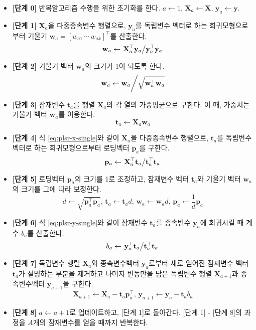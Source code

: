 \documentclass[]{book}
\providecommand{\tightlist}{%
  \setlength{\itemsep}{0pt}\setlength{\parskip}{0pt}}
\begin{document}
\begin{itemize}
\tightlist
\item
  \textbf{{[}단계 0{]}} 반복알고리즘 수행을 위한 초기화를 한다. \(a \leftarrow 1\), \(\mathbf{X}_a \leftarrow \mathbf{X}\), \(\mathbf{y}_a \leftarrow \mathbf{y}\).
\item
  \textbf{{[}단계 1{]}} \(\mathbf{X}_a\)을 다중종속변수 행렬으로, \(\mathbf{y}_a\)를 독립변수 벡터로 하는 회귀모형으로부터 기울기 \(\mathbf{w}_a = [w_{a1} \, \cdots \, w_{ak}]^\top\)를 산출한다.
  \[\mathbf{w}_a \leftarrow \left. \mathbf{X}_a^\top \mathbf{y}_a \middle/ \mathbf{y}_a^\top \mathbf{y}_a \right.  \]
\item
  \textbf{{[}단계 2{]}} 기울기 벡터 \(\mathbf{w}_a\)의 크기가 1이 되도록 한다.
  \[\left. \mathbf{w}_a \leftarrow \mathbf{w}_a \middle/ \sqrt{\mathbf{w}_a^\top \mathbf{w}_a} \right.\]
\item
  \textbf{{[}단계 3{]}} 잠재변수 \(\mathbf{t}_a\)를 행렬 \(\mathbf{X}_a\)의 각 열의 가중평균으로 구한다. 이 때, 가중치는 기울기 벡터 \(\mathbf{w}_a\)를 이용한다.
  \[\mathbf{t}_a \leftarrow \mathbf{X}_a \mathbf{w}_a\]
\item
  \textbf{{[}단계 4{]}} 식 \eqref{eq:plsr-x-single}와 같이 \(\mathbf{X}_a\)을 다중종속변수 행렬으로, \(\mathbf{t}_a\)를 독립변수 벡터로 하는 회귀모형으로부터 로딩벡터 \(\mathbf{p}_a\)를 구한다.
  \[\mathbf{p}_a \leftarrow \left. \mathbf{X}_a^\top \mathbf{t}_a \middle/ \mathbf{t}_a^\top \mathbf{t}_a \right.\]
\item
  \textbf{{[}단계 5{]}} 로딩벡터 \(\mathbf{p}_a\)의 크기를 1로 조정하고, 잠재변수 벡터 \(\mathbf{t}_a\)와 기울기 벡터 \(\mathbf{w}_a\)의 크기를 그에 따라 보정한다.
  \[d \leftarrow \sqrt{\mathbf{p}_a^\top \mathbf{p}_a}, \, \mathbf{t}_a \leftarrow \mathbf{t}_a d, \, \mathbf{w}_a \leftarrow \mathbf{w}_a d, \, \mathbf{p}_a \leftarrow \frac{1}{d} \mathbf{p}_a \]
\item
  \textbf{{[}단계 6{]}} 식 \eqref{eq:plsr-y-single}와 같이 잠재변수 \(\mathbf{t}_a\)를 종속변수 \(\mathbf{y}_a\)에 회귀시킬 때 계수 \(b_a\)를 산출한다.
  \[b_a \leftarrow \left. \mathbf{y}_a^\top \mathbf{t}_a \middle/ \mathbf{t}_a^\top \mathbf{t}_a \right. \]
\item
  \textbf{{[}단계 7{]}} 독립변수 행렬 \(\mathbf{X}_a\)와 종속변수벡터 \(\mathbf{y}_a\)로부터 새로 얻어진 잠재변수 벡터 \(\mathbf{t}_a\)가 설명하는 부분을 제거하고 나머지 변동만을 담은 독립변수 행렬 \(\mathbf{X}_{a + 1}\)과 종속변수벡터 \(\mathbf{y}_{a + 1}\)을 구한다.
  \[\mathbf{X}_{a + 1} \leftarrow \mathbf{X}_a - \mathbf{t}_a \mathbf{p}_a^\top, \, \mathbf{y}_{a + 1} \leftarrow \mathbf{y}_a - \mathbf{t}_a b_a\]
\item
  \textbf{{[}단계 8{]}} \(a \leftarrow a + 1\)로 업데이트하고, {[}단계 1{]}로 돌아간다. {[}단계 1{]} - {[}단계 8{]}의 과정을 \(A\)개의 잠재변수를 얻을 때까지 반복한다.
\end{itemize}
\end{document}
